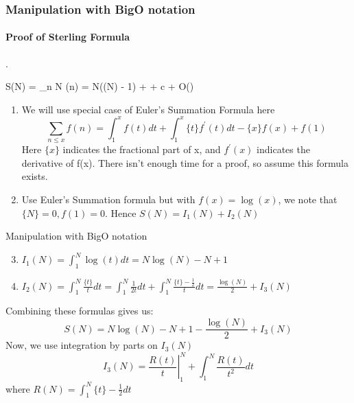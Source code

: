 \documentclass[aspectratio=169, handout]{beamer}
\begin{document}
\begin{frame}
  \frametitle{Manipulation with BigO notation}
  \framesubtitle{Proof of Sterling Formula}.
  \begin{thrm}
    S(N) = \sum_{n \le N} \log(n) = N(\log(N) - 1) +  + c + O()
  \end{thrm}
  \begin{pf}
    \begin{enumerate}
        \item We will use special case of Euler's Summation Formula here
        $$\sum_{n \le x} f(n) = \int_1^x f(t) dt + \int_1^x \{t\} f^\prime(t) dt - \{x\}f(x) + f(1)$$
        Here $\{x\}$ indicates the fractional part of x, and $f^\prime(x)$ indicates the derivative of f(x). There isn't enough time for a proof, so assume this formula exists.\pause
        \item Use Euler's Summation formula but with $f(x) = \log(x)$, we note that $\{N\} = 0, f(1) = 0$. Hence $S(N) = I_1(N) + I_2(N)$
    \end{enumerate}
  \end{pf}
\end{frame}

\begin{frame}{Manipulation with BigO notation}
    \begin{enumerate}
      \setcounter{enumi}{2}
      \item $I_1(N) = \int_1^N \log(t) dt = N\log(N) - N + 1$ \pause
      \item $I_2(N) = \int_1^N \frac{\{t\}}{t} dt = \int_1^N \frac{1}{2t} dt + \int_1^N \frac{\{t\} - \frac{1}{2}}{t} dt = \frac{\log(N)}{2} + I_3(N)$\pause
    \end{enumerate}
    Combining these formulas gives us: $$S(N) = N\log(N) - N + 1 - \frac{\log(N)}{2} + I_3(N)$$
\pause
    Now, we use integration by parts on $I_3(N)$
    $$I_3(N) = \left. \frac{R(t)}{t} \right\rvert_{1}^N + \int_1^N \frac{R(t)}{t^2} dt$$
    where $R(N) = \int_1^N \{t\} - \frac{1}{2} dt$
\end{frame}
\end{document}
